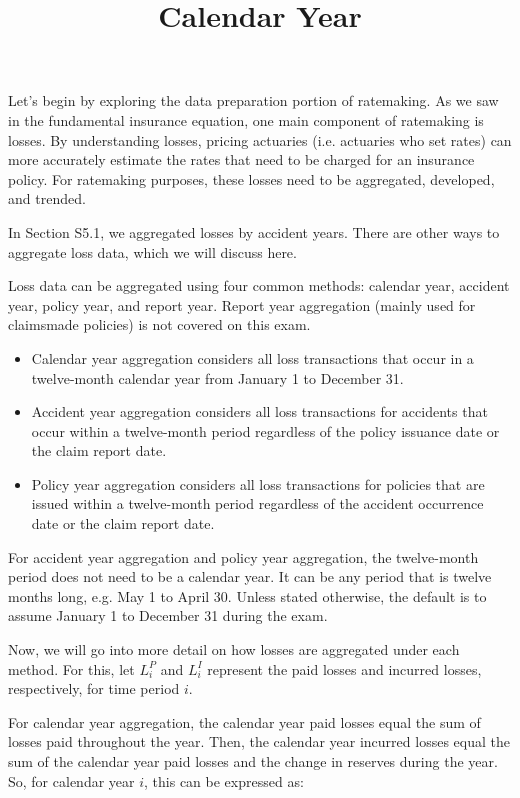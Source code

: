 \documentclass[10pt]{article}
\title{Calendar Year }
\author{}
\date{}
\begin{document}
\maketitle
Let's begin by exploring the data preparation portion of ratemaking. As we saw in the fundamental insurance equation, one main component of ratemaking is losses. By understanding losses, pricing actuaries (i.e. actuaries who set rates) can more accurately estimate the rates that need to be charged for an insurance policy. For ratemaking purposes, these losses need to be aggregated, developed, and trended.

In Section S5.1, we aggregated losses by accident years. There are other ways to aggregate loss data, which we will discuss here.

Loss data can be aggregated using four common methods: calendar year, accident year, policy year, and report year. Report year aggregation (mainly used for claimsmade policies) is not covered on this exam.

\begin{itemize}
  \item Calendar year aggregation considers all loss transactions that occur in a twelve-month calendar year from January 1 to December 31.

  \item Accident year aggregation considers all loss transactions for accidents that occur within a twelve-month period regardless of the policy issuance date or the claim report date.

  \item Policy year aggregation considers all loss transactions for policies that are issued within a twelve-month period regardless of the accident occurrence date or the claim report date.

\end{itemize}

For accident year aggregation and policy year aggregation, the twelve-month period does not need to be a calendar year. It can be any period that is twelve months long, e.g. May 1 to April 30. Unless stated otherwise, the default is to assume January 1 to December 31 during the exam.

Now, we will go into more detail on how losses are aggregated under each method. For this, let $L_{i}^{P}$ and $L_{i}^{I}$ represent the paid losses and incurred losses, respectively, for time period $i$.

For calendar year aggregation, the calendar year paid losses equal the sum of losses paid throughout the year. Then, the calendar year incurred losses equal the sum of the calendar year paid losses and the change in reserves during the year. So, for calendar year $i$, this can be expressed as:
\end{document}
